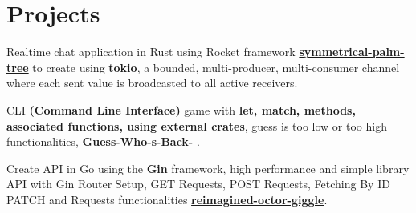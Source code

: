 \documentclass[]{deedy-resume-openfont}
\begin{document}
\begin{minipage}[t]{0.66\textwidth}
\sectionsep


\section{Projects}
\descript{| }
Realtime chat application in Rust using Rocket framework  \textbf{\href{https://github.com/tusharxoxoxo/symmetrical-palm-tree}{symmetrical-palm-tree}} to create using \textbf{tokio}, a bounded, multi-producer, multi-consumer channel where each sent value is broadcasted to all active receivers. 
\sectionsep

\descript{| }
CLI {\textbf{(Command Line Interface)}} game with \textbf{let, match, methods, \\associated functions, using external crates}, guess is too low or too high functionalities, \textbf{\href{https://github.com/tusharxoxoxo/Guess-Who-s-Back-}{Guess-Who-s-Back-}} . 
\sectionsep

\descript{| }
Create API in Go using the \textbf{Gin} framework, high performance and simple library API with Gin Router Setup, GET Requests,
POST Requests, Fetching By ID PATCH and Requests functionalities \textbf{\href{https://github.com/tusharxoxoxo/reimagined-octo-giggle/}{reimagined-octor-giggle}}. 
\sectionsep



\end{minipage}
\end{document}
